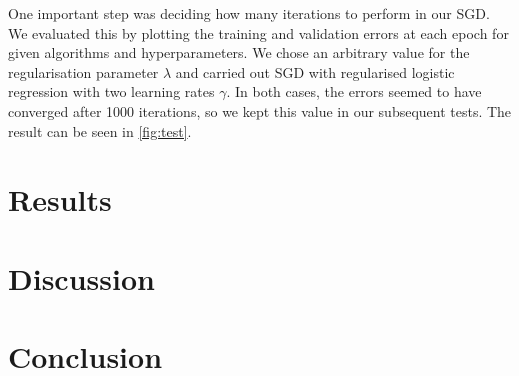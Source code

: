 \documentclass[10pt,conference,compsocconf]{IEEEtran}
\begin{document}
One important step was deciding how many iterations to perform in our
SGD. We evaluated this by plotting the training and validation errors
at each epoch for given algorithms and hyperparameters.
We chose an arbitrary value for the regularisation parameter $\lambda$ and carried out SGD with regularised logistic regression with two learning rates $\gamma$.
In both cases, the errors seemed to have converged after 1000 iterations, so we kept this value in our subsequent tests.
The result can
be seen in \autoref{fig:test}.

\section{Results}

\section{Discussion}

\section{Conclusion}





\end{document}
